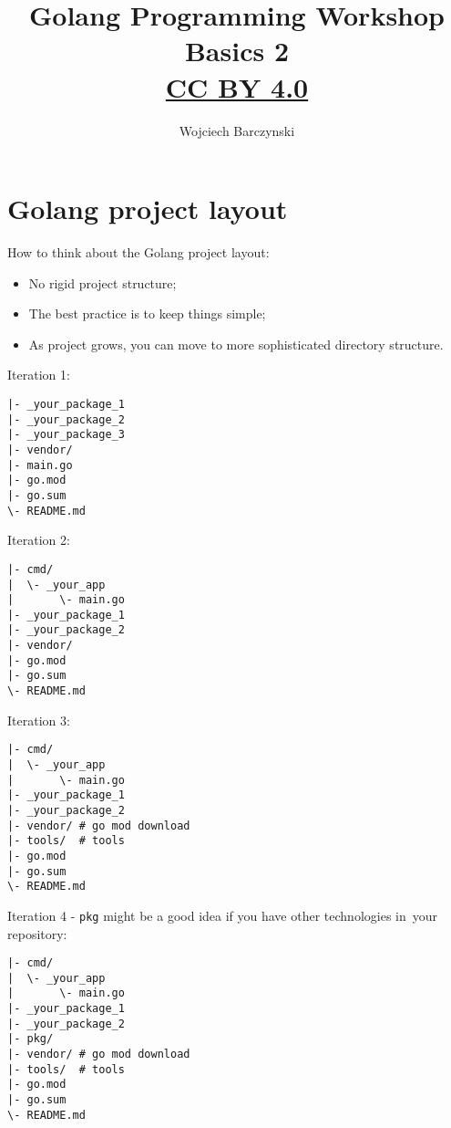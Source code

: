 \documentclass[11pt, letterpaper]{article}
\title{Golang Programming Workshop\\Basics 2\\{ \small \href{https://creativecommons.org/licenses/by/4.0/}{CC BY 4.0} }  }
\author{Wojciech Barczynski}
\date{}
\begin{document}

\begin{titlepage}
\maketitle
\end{titlepage}

\tableofcontents
\pagebreak

\section{Golang project layout}

How to think about the Golang project layout:

\begin{itemize}%
\item No rigid project structure;
\item The best practice is to keep things simple;
\item As project grows, you can move to more sophisticated directory structure.
\end{itemize}%

Iteration 1:

\begin{verbatim}
|- _your_package_1
|- _your_package_2
|- _your_package_3
|- vendor/
|- main.go
|- go.mod
|- go.sum
\- README.md
\end{verbatim}

Iteration 2:

\begin{verbatim}
|- cmd/
|  \- _your_app
|       \- main.go
|- _your_package_1
|- _your_package_2
|- vendor/
|- go.mod
|- go.sum
\- README.md
\end{verbatim}

Iteration 3:

\begin{verbatim}
|- cmd/
|  \- _your_app
|       \- main.go
|- _your_package_1
|- _your_package_2
|- vendor/ # go mod download
|- tools/  # tools
|- go.mod
|- go.sum
\- README.md
\end{verbatim}

Iteration 4 - \verb|pkg| might be a good idea if you have other technologies in~your repository:

\begin{verbatim}
|- cmd/
|  \- _your_app
|       \- main.go
|- _your_package_1
|- _your_package_2
|- pkg/
|- vendor/ # go mod download
|- tools/  # tools
|- go.mod
|- go.sum
\- README.md
\end{verbatim}
\end{document}
